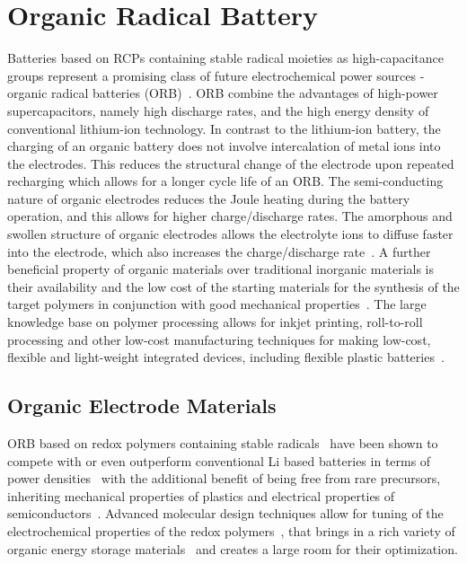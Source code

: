 \section{Organic Radical Battery}

Batteries based on RCPs containing stable radical moieties as high-capacitance groups represent a promising class of future electrochemical power sources - organic radical batteries (ORB)~\cite{nakahara2002_cpl, nishide2004_electact,xie2021_mathoriz,Rohland_2021}. ORB combine the advantages of high-power supercapacitors, namely high discharge rates, and the high energy density of conventional lithium-ion technology. In contrast to the lithium-ion battery, the charging of an organic battery does not involve intercalation of metal ions into the electrodes. This reduces the structural change of the electrode upon repeated recharging which allows for a longer cycle life of an ORB. The semi-conducting nature of organic electrodes reduces the Joule heating during the battery operation, and this allows for higher charge/discharge rates. The amorphous and swollen structure of organic electrodes allows the electrolyte ions to diffuse faster into the electrode, which also increases the charge/discharge rate~\cite{nishide_2009}. A further beneficial property of organic materials over traditional inorganic materials is their availability and the low cost of the starting materials for the synthesis of the target polymers in conjunction with good mechanical properties~\cite{janoschka2012_advmater, muench2016_chemrev, friebe2017_topcurrchem}. The large knowledge base on polymer processing allows for inkjet printing, roll-to-roll processing and other low-cost manufacturing techniques for making low-cost, flexible and light-weight integrated devices, including flexible plastic batteries~\cite{janoschka2012_advmater,nishide_2009}. 

\subsection{Organic Electrode Materials}
\label{sec:ORB_materials}
ORB based on redox polymers containing stable radicals~\cite{nakahara2002_cpl} have been shown to compete with or even outperform  conventional Li based batteries in terms of power densities~\cite{IWASA2007} with the additional benefit of being free from rare precursors, inheriting mechanical properties of plastics and electrical properties of semiconductors~\cite{friebe2017_topcurrchem,Casado2021,Goujon2021}. Advanced molecular design techniques allow for tuning of the electrochemical properties of the redox polymers~\cite{Janoschka2017}, that brings in a rich variety of organic energy storage materials~\cite{Xie2021,Vereshchagin2022,Janoschka2017a} and creates a large room for their optimization. 

